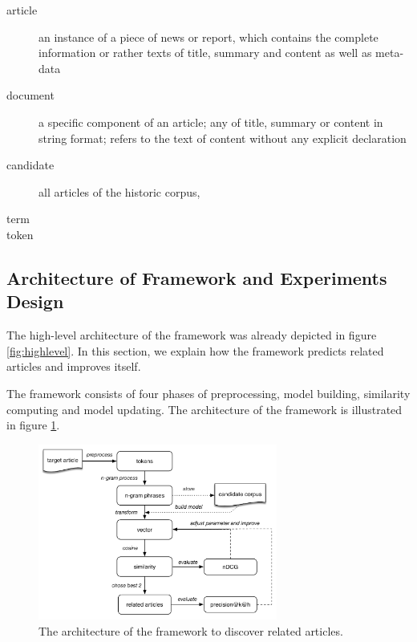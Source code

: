 \begin{description}
\item[article] an instance of a piece of news or report, which contains the complete information or rather texts of title, summary and content as well as meta-data 
\item[document] a specific component of an article; any of title, summary or content in string format; refers to the text of content without any explicit declaration 
\item[candidate] all articles of the historic corpus,  
\item[term]  
\item[token]

\label{tab:def_terms}
\end{description}



\subsection{Architecture of Framework and Experiments Design}
\label{sec:4.3}

The high-level architecture of the framework was already depicted in figure \ref{fig:highlevel}. In this section, we explain how the framework predicts related articles and improves itself. 

The framework consists of four phases of preprocessing, model building, similarity computing and model updating. The architecture of the framework is illustrated in figure \ref{fig:unsupervised}. 

\begin{figure}[!htb]
    \centering
    \includegraphics[width=0.7\textwidth]{fig/unsupervise}
    \caption{The architecture of the framework to discover related articles.}
    \label{fig:unsupervised}
\end{figure}


